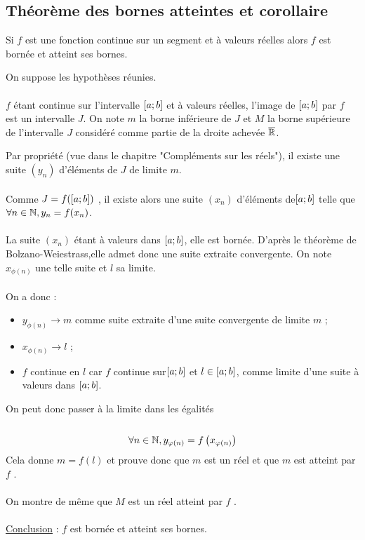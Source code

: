 \subsection{Théorème des bornes atteintes et corollaire}
\begin{theo}
    Si \(f\) est une fonction continue sur un segment et à valeurs réelles alors \(f\) est bornée et atteint ses bornes.
\end{theo}
\begin{dem}
    On suppose les hypothèses réunies.\\~\\
    \(f\) étant continue sur l’intervalle \(\left[a;b\right]\) et à valeurs réelles, l’image de \(\left[a;b\right]\) par \(f\) est un intervalle \(J\). On note \(m\) la borne inférieure de \(J\) et \(M\) la borne supérieure de l’intervalle \(J\) considéré comme partie de la droite achevée \(\overline{\mathbb{R}}\).

    Par propriété (vue dans le chapitre "Compléments sur les réels"), il existe une suite \((y_n)\) d’éléments de \(J\) de limite \(m\).\\~\\
    Comme \(J = f (\left[a;b\right])\) , il existe alors une suite \((x_n)\) d’éléments de\( \left[a;b\right]\) telle que \(\forall n \in \mathbb{N}, y_n = f (x_n)\).\\~\\
    La suite \((x_n)\) étant à valeurs dans \(\left[a;b\right]\), elle est bornée. D’après le théorème de Bolzano-Weiestrass,elle admet donc une suite extraite convergente. On note \(x_{\phi(n)}\) une telle suite et \(l\) sa limite.\\~\\
    On a donc :
    \begin{itemize}
        \item  \(y_{\phi(n)} \to  m\) comme suite extraite d’une suite convergente de limite \(m\) ;
        \item \(x_{\phi(n)} \to l\)  ;
        \item \(f\) continue en \(l\) car \(f\) continue sur\( \left[a;b\right]\) et \(l \in \left[a;b\right]\), comme limite d’une suite à valeurs dans \(\left[a;b\right]\).
    \end{itemize}
    On peut donc passer à la limite dans les égalités\\~\\
    \[\forall n \in \mathbb{N}, y_{\varphi(n)} = f\left(x_{\varphi(n)}\right)\]
    Cela donne \(m = f (l)\) et prouve donc que \(m\) est un réel et que \(m\) est atteint par \(f\) .\\~\\
    On montre de même que \(M\) est un réel atteint par \(f\) .\\~\\
    \underline{Conclusion} : \(f\) est bornée et atteint ses bornes.
\end{dem}


